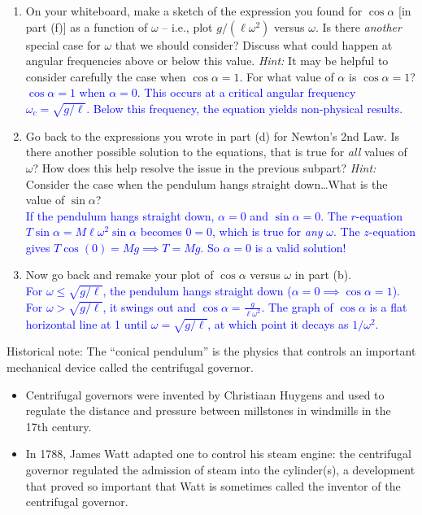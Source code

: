 \documentclass[11pt, letterpaper, openany]{book}
\newenvironment{exercise}[1][Exercise]{%
  \tcolorbox[blanker, breakable, left=1em,
    before skip=1em, after skip=1em,
    borderline west={3pt}{0pt}{PhysNavy},
    colback=PhysCream,
    before upper={\textcolor{PhysNavy}{\sffamily\bfseries #1:}\space}
  ]%
}{%
  \endtcolorbox%
}
\begin{document}
\begin{exercise}[Exercise 3: The Conical Pendulum]
\begin{enumerate}[label=(\alph*)]
    \item On your whiteboard, make a sketch of the expression you found for $\cos\alpha$ [in part (f)] as a function of $\omega$ -- i.e., plot $g/(\ell\omega^2)$ versus $\omega$.
    Is there \textit{another} special case for $\omega$ that we should consider? Discuss what could happen at angular frequencies above or below this value.
    \textit{Hint:} It may be helpful to consider carefully the case when $\cos\alpha = 1$. For what value of $\alpha$ is $\cos\alpha = 1$? \\
    \textcolor{blue}{$\cos\alpha = 1$ when $\alpha = 0$. This occurs at a critical angular frequency $\omega_c = \sqrt{g/\ell}$. Below this frequency, the equation yields non-physical results.}
    
    \item Go back to the expressions you wrote in part (d) for Newton's 2nd Law. Is there another possible solution to the equations, that is true for \textit{all} values of $\omega$? How does this help resolve the issue in the previous subpart?
    \textit{Hint:} Consider the case when the pendulum hangs straight down\dots What is the value of $\sin\alpha$? \\
    \textcolor{blue}{If the pendulum hangs straight down, $\alpha = 0$ and $\sin\alpha = 0$.
    The $r$-equation $T\sin\alpha = M\ell\omega^2\sin\alpha$ becomes $0 = 0$, which is true for \textit{any} $\omega$.
    The $z$-equation gives $T\cos(0) = Mg \implies T = Mg$.
    So $\alpha = 0$ is a valid solution!}
    
    \item Now go back and remake your plot of $\cos\alpha$ versus $\omega$ in part (b). \\
    \textcolor{blue}{For $\omega \le \sqrt{g/\ell}$, the pendulum hangs straight down ($\alpha = 0 \implies \cos\alpha = 1$). For $\omega > \sqrt{g/\ell}$, it swings out and $\cos\alpha = \frac{g}{\ell\omega^2}$. The graph of $\cos\alpha$ is a flat horizontal line at 1 until $\omega = \sqrt{g/\ell}$, at which point it decays as $1/\omega^2$.}
\end{enumerate}
\end{exercise}

Historical note: The ``conical pendulum'' is the physics that controls an important mechanical device called the centrifugal governor.
\begin{itemize}
    \item Centrifugal governors were invented by Christiaan Huygens and used to regulate the distance and pressure between millstones in windmills in the 17th century.
    \item In 1788, James Watt adapted one to control his steam engine: the centrifugal governor regulated the admission of steam into the cylinder(s), a development that proved so important that Watt is sometimes called the inventor of the centrifugal governor.
\end{itemize}
\end{document}
